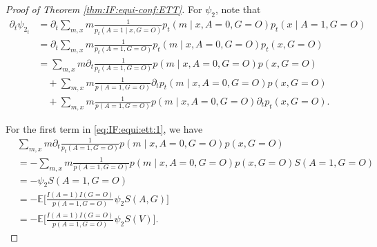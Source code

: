 \documentclass[10pt]{article}
\newcommand{\E}{\mathbb{E}}
\begin{document}
\begin{proof}[Proof of Theorem \ref{thm:IF:equi-conf:ETT}]
For $\psi_2$, note that
\begin{equation}
\label{eq:IF:equi:ett:1}
\begin{aligned}
\partial_t\psi_{2_t} 
&=\partial_t \sum_{m,x} m\frac{1}{p_t(A=1\mid x,G=O)}p_t(m\mid x,A=0,G=O)p_t(x\mid A=1,G=O)\\
&=\partial_t \sum_{m,x} m\frac{1}{p_t(A=1,G=O)}p_t(m\mid x,A=0,G=O)p_t(x,G=O)\\
&= \sum_{m,x} m \partial_t\frac{1}{p_t(A=1,G=O)}p(m\mid x,A=0,G=O)p(x,G=O)\\
&\quad+\sum_{m,x} m \frac{1}{p(A=1,G=O)}\partial_t p_t(m\mid x,A=0,G=O)p(x,G=O)\\
&\quad+\sum_{m,x} m \frac{1}{p(A=1,G=O)}p(m\mid x,A=0,G=O)\partial_t p_t(x,G=O).
\end{aligned}
\end{equation}

For the first term in \eqref{eq:IF:equi:ett:1}, we have
\begin{equation}
\label{eq:IF:equi:ett:2}
\begin{aligned}
&\sum_{m,x} m \partial_t\frac{1}{p_t(A=1,G=O)}p(m\mid x,A=0,G=O)p(x,G=O)\\
&=-\sum_{m,x} m \frac{1}{p(A=1,G=O)}p(m\mid x,A=0,G=O)p(x,G=O)S(A=1,G=O)\\
&=-\psi_2S(A=1,G=O)\\
&=-\E\Big[\frac{I(A=1)I(G=O)}{p(A=1,G=O)}\psi_2S(A,G)\Big]\\
&=-\E\Big[\frac{I(A=1)I(G=O)}{p(A=1,G=O)}\psi_2S(V)\Big].
\end{aligned}
\end{equation}


\end{proof}
\end{document}
